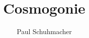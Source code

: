 \documentclass[a4paper,14pt]{book}
\begin{document}
\author{Paul Schuhmacher}
\title{Cosmogonie}
\date{}
 

\frontmatter
\maketitle
\tableofcontents

\mainmatter




\backmatter
\end{document}
